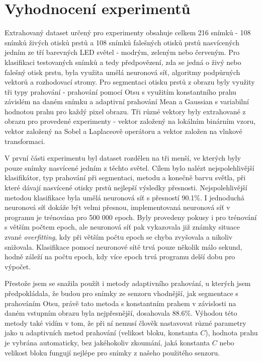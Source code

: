 \section{Vyhodnocení experimentů}
Extrahovaný dataset určený pro experimenty obsahuje celkem 216 snímků - 108 snímků živých otisků prstů a 108 snímků falešných otisků prstů nasvícených jedním ze tří barevných LED světel - modrým, zeleným nebo červeným. Pro klasifikaci testovaných snímků a tedy předpovězení, zda se jedná o živý nebo falešný otisk prstu, byla využita umělá neuronová síť, algoritmy podpůrných vektorů a rozhodovací stromy. Pro segmentaci otisku prstů z obrazu byly využity tři typy prahování - prahování pomocí Otsu s využitím konstantního prahu závislém na daném snímku a adaptivní prahování Mean a Gaussian s variabilní hodnotou prahu pro každý pixel obrazu. Tři různé vektory byly extrahované z obrazu pro provedené experimenty - vektor založený na lokálním binárním vzoru, vektor založený na Sobel a Laplaceově operátoru a vektor založen na vlnkové transformaci.

V první části experimentu byl dataset rozdělen na tři menší, ve kterých byly pouze snímky nasvícené jedním z těchto světel. Cílem bylo nalézt nejspolehlivější klasifikátor, typ prahování při segmentaci, metodu a konečně barvu světla, při které dávají nasvícené otisky prstů nejlepší výsledky přesnosti. Nejspolehlivější metodou klasifikace byla umělá neuronová síť s přesností 90.1\%. I jednoduchá neuronová síť dokáže být velmi přesnou, implementovaná neuronová síť v programu je trénována pro 500 000 epoch. Byly provedeny pokusy i pro trénování s větším počtem epoch, ale neuronová síť pak vykazovala již známky situace zvané \textit{overfitting}, kdy při větším počtu epoch se chyba zvyšovala a nikoliv snižovala. Klasifikace pomocí neuronové sítě trvá pouze několik málo sekund, hodně záleží na počtu epoch, kdy více epoch trvá programu delší dobu pro výpočet. 

Přestože jsem se snažila použít i metody adaptivního prahování, u kterých jsem předpokládala, že budou pro snímky ze senzoru vhodnější, jak segmentace s prahováním Otsu, právě tato metoda s konstantním prahem v závislosti na daném vstupním obrazu byla nejpřesnější, dosahovala 88.6\%. Výhodou této metody také vidím v tom, že při ní nemusí člověk nastavovat různé parametry jako u adaptivních metod prahování (velikost bloku, konstanta $C$), hodnota prahu je vybrána automaticky, bez jakéhokoliv zkoumání, jaká konstanta $C$ nebo velikost bloku fungují nejlépe pro snímky z našeho použitého senzoru. 

